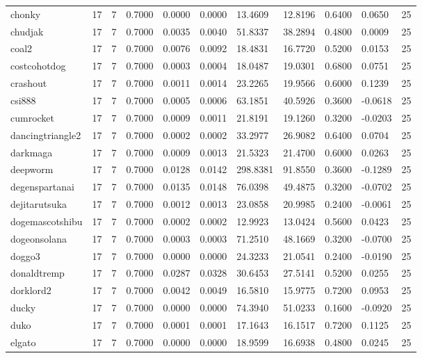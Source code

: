 \begin{table}[htbp]
\begin{tabular}{lllllllllll}
chonky & 17 & 7 & 0.7000 & 0.0000 & 0.0000 & 13.4609 & 12.8196 & 0.6400 & 0.0650 & 25 \\
chudjak & 17 & 7 & 0.7000 & 0.0035 & 0.0040 & 51.8337 & 38.2894 & 0.4800 & 0.0009 & 25 \\
coal2 & 17 & 7 & 0.7000 & 0.0076 & 0.0092 & 18.4831 & 16.7720 & 0.5200 & 0.0153 & 25 \\
costcohotdog & 17 & 7 & 0.7000 & 0.0003 & 0.0004 & 18.0487 & 19.0301 & 0.6800 & 0.0751 & 25 \\
crashout & 17 & 7 & 0.7000 & 0.0011 & 0.0014 & 23.2265 & 19.9566 & 0.6000 & 0.1239 & 25 \\
csi888 & 17 & 7 & 0.7000 & 0.0005 & 0.0006 & 63.1851 & 40.5926 & 0.3600 & -0.0618 & 25 \\
cumrocket & 17 & 7 & 0.7000 & 0.0009 & 0.0011 & 21.8191 & 19.1260 & 0.3200 & -0.0203 & 25 \\
dancingtriangle2 & 17 & 7 & 0.7000 & 0.0002 & 0.0002 & 33.2977 & 26.9082 & 0.6400 & 0.0704 & 25 \\
darkmaga & 17 & 7 & 0.7000 & 0.0009 & 0.0013 & 21.5323 & 21.4700 & 0.6000 & 0.0263 & 25 \\
deepworm & 17 & 7 & 0.7000 & 0.0128 & 0.0142 & 298.8381 & 91.8550 & 0.3600 & -0.1289 & 25 \\
degenspartanai & 17 & 7 & 0.7000 & 0.0135 & 0.0148 & 76.0398 & 49.4875 & 0.3200 & -0.0702 & 25 \\
dejitarutsuka & 17 & 7 & 0.7000 & 0.0012 & 0.0013 & 23.0858 & 20.9985 & 0.2400 & -0.0061 & 25 \\
dogemascotshibu & 17 & 7 & 0.7000 & 0.0002 & 0.0002 & 12.9923 & 13.0424 & 0.5600 & 0.0423 & 25 \\
dogeonsolana & 17 & 7 & 0.7000 & 0.0003 & 0.0003 & 71.2510 & 48.1669 & 0.3200 & -0.0700 & 25 \\
doggo3 & 17 & 7 & 0.7000 & 0.0000 & 0.0000 & 24.3233 & 21.0541 & 0.2400 & -0.0190 & 25 \\
donaldtremp & 17 & 7 & 0.7000 & 0.0287 & 0.0328 & 30.6453 & 27.5141 & 0.5200 & 0.0255 & 25 \\
dorklord2 & 17 & 7 & 0.7000 & 0.0042 & 0.0049 & 16.5810 & 15.9775 & 0.7200 & 0.0953 & 25 \\
ducky & 17 & 7 & 0.7000 & 0.0000 & 0.0000 & 74.3940 & 51.0233 & 0.1600 & -0.0920 & 25 \\
duko & 17 & 7 & 0.7000 & 0.0001 & 0.0001 & 17.1643 & 16.1517 & 0.7200 & 0.1125 & 25 \\
elgato & 17 & 7 & 0.7000 & 0.0000 & 0.0000 & 18.9599 & 16.6938 & 0.4800 & 0.0245 & 25 \\

\end{tabular}
\end{table}
